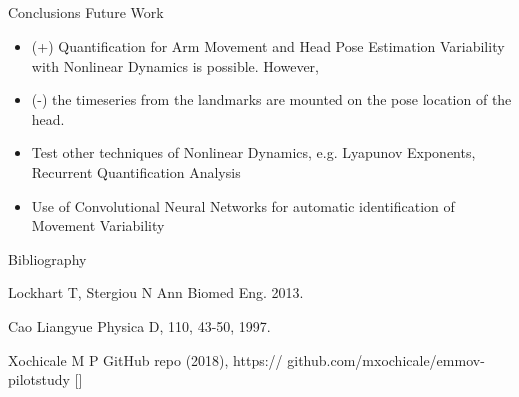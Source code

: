\documentclass[compress]{beamer}
\begin{document}
\subsection{}
{
\begin{frame}{Conclusions Future Work}

\begin{itemize}
	\item (+) Quantification for Arm Movement and Head Pose Estimation Variability with Nonlinear Dynamics is possible. However,
	\item (-) the timeseries from the landmarks are mounted on the pose location of the head. 
\end{itemize}

\begin{itemize}
	\item Test other techniques of Nonlinear Dynamics, e.g. Lyapunov Exponents, Recurrent Quantification Analysis
	\item Use of Convolutional Neural Networks for automatic identification of Movement Variability
\end{itemize}



\end{frame}
}






\begin{frame}{Bibliography}
    \begin{thebibliography}{10}

\beamertemplatearticlebibitems


      Lockhart T, Stergiou N 
      \newblock {}
	\newblock Ann Biomed Eng. 2013.

      Cao Liangyue
      \newblock {}
      \newblock Physica D, 110, 43-50, 1997.  

      Xochicale M P
      \newblock {}
      \newblock GitHub repo (2018), https:// github.com/mxochicale/emmov-pilotstudy [\href{https:// github.com/mxochicale/emmov-pilotstudy}{\faGithub}]


    \end{thebibliography}
\end{frame}




\closingtitle


\end{document}
